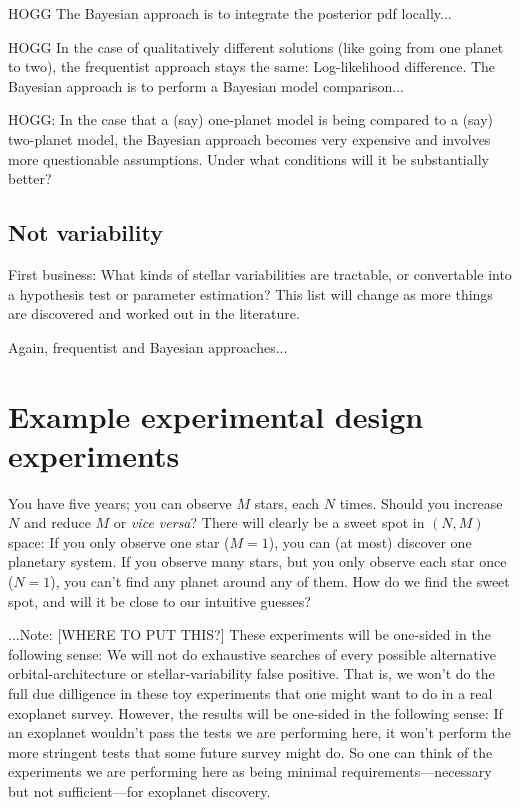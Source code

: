 \documentclass[modern]{aastex63}
\newcommand{\foreign}[1]{\textsl{#1}}
\begin{document}
HOGG The Bayesian approach is to integrate the posterior pdf locally...

HOGG In the case of qualitatively different solutions (like going from one
planet to two), the frequentist approach stays the same:
Log-likelihood difference. The Bayesian approach is to perform a
Bayesian model comparison...

HOGG: In the case that a (say) one-planet model is being compared to a
(say) two-planet model, the Bayesian approach becomes very expensive
and involves more questionable assumptions. Under what conditions will
it be substantially better?

\subsection{Not variability}

First business: What kinds of stellar variabilities are tractable, or
convertable into a hypothesis test or parameter estimation? This list
will change as more things are discovered and worked out in the
literature.

Again, frequentist and Bayesian approaches...

\section{Example experimental design experiments}

You have five years; you can observe $M$ stars, each $N$ times. Should
you increase $N$ and reduce $M$ or \foreign{vice versa}? There will
clearly be a sweet spot in $(N,M)$ space: If you only observe one star
($M=1$), you can (at most) discover one planetary system. If you
observe many stars, but you only observe each star once ($N=1$), you
can't find any planet around any of them. How do we find the sweet
spot, and will it be close to our intuitive guesses?

...Note: [WHERE TO PUT THIS?]
These experiments will be one-sided in the following sense: We will
not do exhaustive searches of every possible alternative
orbital-architecture or stellar-variability false positive. That is, we
won't do the full due dilligence in these toy experiments that one might
want to do in a real exoplanet survey. However, the results will be one-sided
in the following sense: If an exoplanet wouldn't pass the tests we are
performing here, it won't perform the more stringent tests that some future
survey might do. So one can think of the experiments we are performing here
as being minimal requirements---necessary but not sufficient---for exoplanet
discovery.
\end{document}

